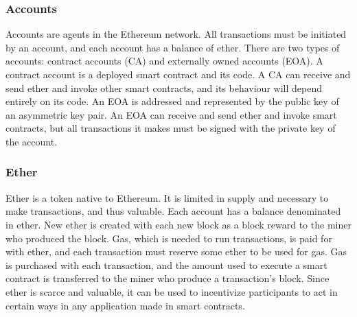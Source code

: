 \subsubsection{Accounts}
Accounts are agents in the Ethereum network. All transactions must be initiated by an account, and each account has a balance of ether. There are two types of accounts: contract accounts (CA) and externally owned accounts (EOA). A contract account is a deployed smart contract and its code. A CA can receive and send ether and invoke other smart contracts, and its behaviour will depend entirely on its code. An EOA is addressed and represented by the public key of an asymmetric key pair. An EOA can receive and send ether and invoke smart contracts, but all transactions it makes must be signed with the private key of the account. 

\subsubsection{Ether}
Ether is a token native to Ethereum. It is limited in supply and necessary to make transactions, and thus valuable. Each account has a balance denominated in ether. New ether is created with each new block as a block reward to the miner who produced the block. Gas, which is needed to run transactions, is paid for with ether, and each transaction must reserve some ether to be used for gas. Gas is purchased with each transaction, and the amount used to execute a smart contract is transferred to the miner who produce a transaction's block. Since ether is scarce and valuable, it can be used to incentivize participants to act in certain ways in any application made in smart contracts.
